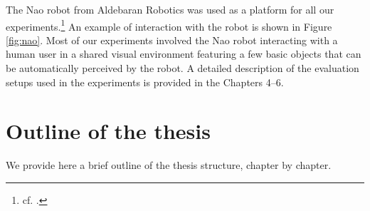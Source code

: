 The Nao robot from Aldebaran Robotics was used as a platform for all our experiments.\footnote{cf.  .}  An example of interaction with the robot is shown in Figure \ref{fig:nao}.  Most of our experiments involved the Nao robot interacting with a human user in a shared visual environment featuring a few basic objects that can be automatically perceived by the robot.  A detailed description of the evaluation setups used in the experiments is provided in the Chapters 4--6. 

\section{Outline of the thesis}

We provide here a brief outline of the thesis structure, chapter by chapter. 

